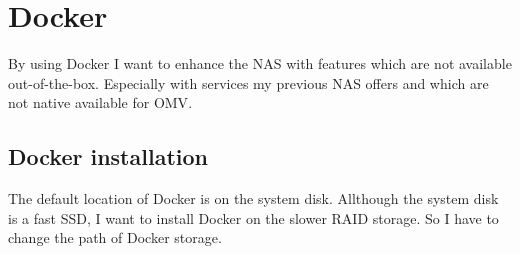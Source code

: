 

\section{Docker}

By using \gls{Docker} I want to enhance the \gls{NAS} with features which are not
available out-of-the-box. Especially with services my previous \gls{NAS} offers
and which are not native available for \gls{OMV}.

\subsection{Docker installation}

The default location of \gls{Docker} is  on the
system disk. Allthough the system disk is a fast SSD, I want to install
\gls{Docker} on the slower RAID storage. So I have to change the path of
\gls{Docker} storage.


